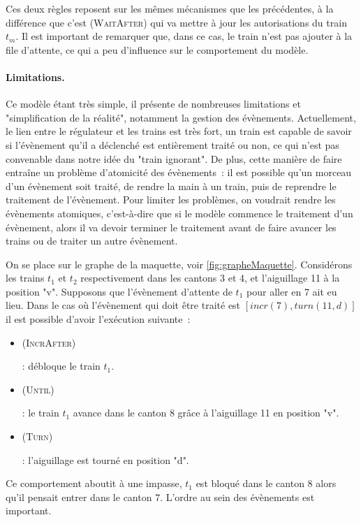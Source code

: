 \documentclass[oneside, a4paper, 11pt]{book}
\newcommand{\ruleFmt}[1]{\textsc{(#1)}}
\newcommand{\ruleDef}[1]{\hypertarget{#1}{\ruleFmt{#1}}}
\newcommand{\trainFmt}[1]{{\color{traincolor} #1}}
\begin{document}
Ces deux règles reposent sur les mêmes mécanismes que les précédentes, à la différence que c'est \ruleDef{WaitAfter} qui va mettre à jour les autorisations du train \trainFmt{$t_m$}.
Il est important de remarquer que, dans ce cas, le train n'est pas ajouter à la file d'attente, ce qui a peu d'influence sur le comportement du modèle.


\paragraph{Limitations.}
Ce modèle étant très simple, il présente de nombreuses limitations et "simplification de la réalité", notamment la gestion des évènements. 
Actuellement, le lien entre le régulateur et les trains est très fort, un train est capable de savoir si l'évènement qu'il a déclenché est entièrement traité ou non, ce qui n'est pas convenable dans notre idée du "train ignorant".
De plus, cette manière de faire entraîne un problème d'atomicité des évènements~: il est possible qu'un morceau d'un évènement soit traité, de rendre la main à un train, puis de reprendre le traitement de l'évènement.
Pour limiter les problèmes, on voudrait rendre les évènements atomiques, c'est-à-dire que si le modèle commence le traitement d'un évènement, alors il va devoir terminer le traitement avant de faire avancer les trains ou de traiter un autre évènement.


\begin{example}[Atomicité]
	On se place sur le graphe de la maquette, voir \ref{fig:grapheMaquette}. Considérons les trains $t_1$ et $t_2$ respectivement dans les cantons 3 et 4, et l'aiguillage 11 à la position "v". Supposons que l'évènement d'attente de $t_1$ pour aller en 7 ait eu lieu.
	Dans le cas où l'évènement qui doit être traité est $[incr(7),turn(11,d)]$ il est possible d'avoir l'exécution suivante~:
	\begin{itemize}
		\item \ruleDef{IncrAfter} : débloque le train $t_1$.
		\item \ruleDef{Until} : le train $t_1$ avance dans le canton 8 grâce à l'aiguillage 11 en position "v".
		\item \ruleDef{Turn} : l'aiguillage est tourné en position "d".
	\end{itemize}
	Ce comportement aboutit à une impasse, $t_1$ est bloqué dans le canton 8 alors qu'il pensait entrer dans le canton 7. L'ordre au sein des évènements est important.
\end{example}
\end{document}
